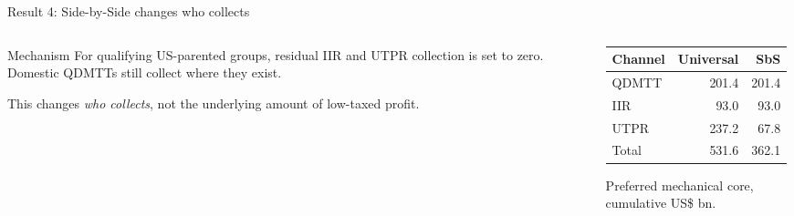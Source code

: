 \documentclass[aspectratio=169, 11pt]{beamer}
\begin{document}
\begin{frame}{Result 4: Side-by-Side changes who collects}
\begin{columns}[T]
\begin{column}{0.47\textwidth}
\begin{block}{Mechanism}
  For qualifying US-parented groups, residual IIR and UTPR collection is set to zero. Domestic QDMTTs still collect where they exist.
\end{block}

\vspace{0.35em}
This changes \emph{who collects}, not the underlying amount of low-taxed profit.
\end{column}
\begin{column}{0.49\textwidth}
\begin{center}
\small
\begin{tabular}{@{}lrr@{}}
  \toprule
  Channel & Universal & SbS \\
  \midrule
  QDMTT & 201.4 & 201.4 \\
  IIR & 93.0 & 93.0 \\
  UTPR & 237.2 & 67.8 \\
  \midrule
  Total & 531.6 & 362.1 \\
  \bottomrule
\end{tabular}
\end{center}

\vspace{0.15em}
\centering
\scriptsize Preferred mechanical core, cumulative US\$ bn.
\end{column}
\end{columns}
\end{frame}
\end{document}
